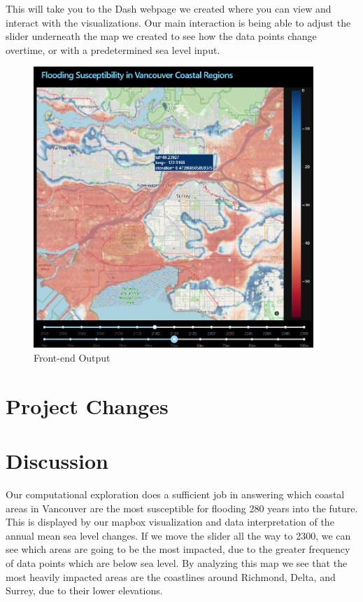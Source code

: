 \documentclass[fontsize=11pt]{article}
\begin{document}
This will take you to the Dash webpage we created where you can view and interact with the visualizations. Our main interaction is being able to adjust the slider underneath the map we created to see how the data points change overtime, or with a predetermined sea level input. \\
\begin{figure}[h]
\centering 
\includegraphics[width=300pt]{frontend.png}
\caption{Front-end Output}
\end{figure}
 

\section*{Project Changes}
 
\section*{Discussion}
\hspace{\parindent}Our computational exploration does a sufficient job in answering which coastal areas in Vancouver are the most susceptible for flooding 280 years into the future. This is displayed by our mapbox visualization and data interpretation of the annual mean sea level changes. If we move the slider all the way to 2300, we can see which areas are going to be the most impacted, due to the greater frequency of data points which are below sea level.  By analyzing this map we see that the most heavily impacted areas are the coastlines around Richmond, Delta, and Surrey, due to their lower elevations. \\
\end{document}
